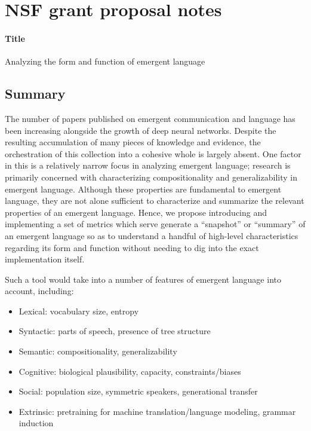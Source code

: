 \section{NSF grant proposal notes}

\paragraph{Title}
Analyzing the form and function of emergent language

\subsection{Summary}
The number of papers published on emergent communication and language has been increasing alongside the growth of deep neural networks.
Despite the resulting accumulation of many pieces of knowledge and evidence, the orchestration of this collection into a cohesive whole is largely absent.
One factor in this is a relatively narrow focus in analyzing emergent language; research is primarily concerned with characterizing compositionality and generalizability in emergent language.
Although these properties are fundamental to emergent language, they are not alone sufficient to characterize and summarize the relevant properties of an emergent language.
Hence, we propose introducing and implementing a set of metrics which serve generate a ``snapshot'' or ``summary'' of an emergent language so as to understand a handful of high-level characteristics regarding its form and function without needing to dig into the exact implementation itself.

Such a tool would take into a number of features of emergent language into account, including:
\begin{itemize}
    \item Lexical: vocabulary size, entropy
    \item Syntactic: parts of speech, presence of tree structure
    \item Semantic: compositionality, generalizability
    \item Cognitive: biological plausibility, capacity, constraints/biases
    \item Social: population size, symmetric speakers, generational transfer
    \item Extrinsic: pretraining for machine translation/language modeling, grammar induction
\end{itemize}

